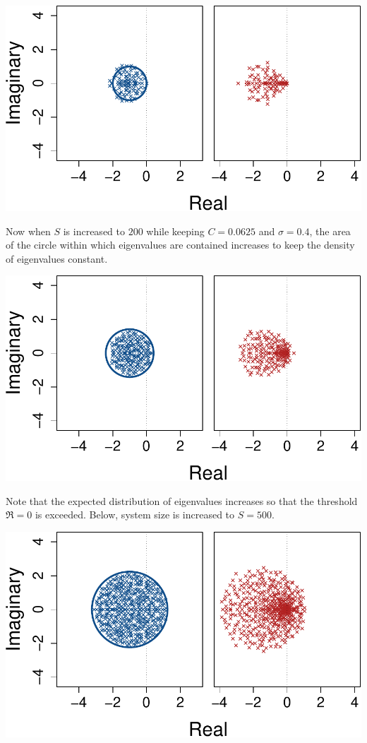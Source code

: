 \documentclass[]{article}
\begin{document}
\includegraphics{unnamed-chunk-41-1.pdf}

Now when \(S\) is increased to \(200\) while keeping \(C = 0.0625\) and
\(\sigma = 0.4\), the area of the circle within which eigenvalues are
contained increases to keep the density of eigenvalues constant.

\includegraphics{unnamed-chunk-42-1.pdf}

Note that the expected distribution of eigenvalues increases so that the
threshold \(\Re = 0\) is exceeded. Below, system size is increased to
\(S = 500\).

\includegraphics{unnamed-chunk-43-1.pdf}
\end{document}
